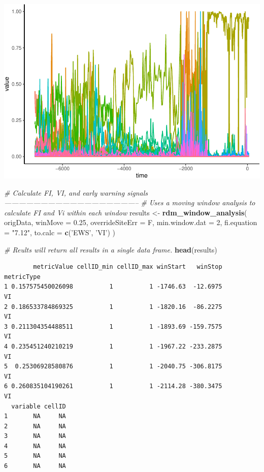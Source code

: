 \documentclass[12pt,twoside,openany]{reedthesis}
\newenvironment{Shaded}{\begin{snugshade}}{\end{snugshade}}
\newcommand{\CommentTok}[1]{\textcolor[rgb]{0.56,0.35,0.01}{\textit{#1}}}
\newcommand{\DataTypeTok}[1]{\textcolor[rgb]{0.13,0.29,0.53}{#1}}
\newcommand{\DecValTok}[1]{\textcolor[rgb]{0.00,0.00,0.81}{#1}}
\newcommand{\FloatTok}[1]{\textcolor[rgb]{0.00,0.00,0.81}{#1}}
\newcommand{\KeywordTok}[1]{\textcolor[rgb]{0.13,0.29,0.53}{\textbf{#1}}}
\newcommand{\NormalTok}[1]{#1}
\newcommand{\StringTok}[1]{\textcolor[rgb]{0.31,0.60,0.02}{#1}}
\begin{document}
\includegraphics{_myDissertation_files/figure-latex/unnamed-chunk-7-1.pdf}
\begin{Shaded}
\begin{Highlighting}[]
\CommentTok{# Calculate FI, VI, and early warning signals --------------------------------------------------------}
\CommentTok{# Uses a moving window analysis to calculate FI and Vi within each window}
\NormalTok{results <-}
\StringTok{    }\KeywordTok{rdm_window_analysis}\NormalTok{(}
\NormalTok{        origData,}
        \DataTypeTok{winMove =} \FloatTok{0.25}\NormalTok{,}
        \DataTypeTok{overrideSiteErr =}\NormalTok{ F,}
        \DataTypeTok{min.window.dat =} \DecValTok{2}\NormalTok{,}
        \DataTypeTok{fi.equation =} \StringTok{"7.12"}\NormalTok{,}
        \DataTypeTok{to.calc =} \KeywordTok{c}\NormalTok{(}\StringTok{'EWS'}\NormalTok{, }\StringTok{'VI'}\NormalTok{)}
\NormalTok{    )}

\CommentTok{# Reults will return all results in a single data frame.}
\KeywordTok{head}\NormalTok{(results)}
\end{Highlighting}
\end{Shaded}
\begin{verbatim}
        metricValue cellID_min cellID_max winStart   winStop metricType
1 0.157575450026098          1          1 -1746.63  -12.6975         VI
2 0.186533784869325          1          1 -1820.16  -86.2275         VI
3 0.211304354488511          1          1 -1893.69 -159.7575         VI
4 0.235451240210219          1          1 -1967.22 -233.2875         VI
5  0.25306928580876          1          1 -2040.75 -306.8175         VI
6 0.260835104190261          1          1 -2114.28 -380.3475         VI
  variable cellID
1       NA     NA
2       NA     NA
3       NA     NA
4       NA     NA
5       NA     NA
6       NA     NA
\end{verbatim}
\appendix
\end{document}
